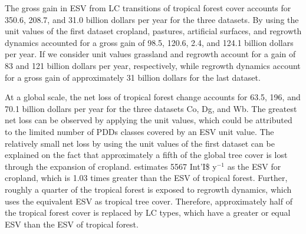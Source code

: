 		The gross gain in \ac{ESV} from \ac{LC} transitions of tropical forest cover accounts for 350.6, 208.7, and 31.0 billion dollars per year for the three datasets. By using the unit values of the first dataset cropland, pastures, artificial surfaces, and regrowth dynamics accounted for a gross gain of 98.5, 120.6, 2.4, and 124.1 billion dollars per year. If we consider \citet{Groot2012} unit values grassland and regrowth account for a gain of 83 and 121 billion dollars per year, respectively, while regrowth dynamics account for a gross gain of approximately 31 billion dollars for the last dataset.

		At a global scale, the net loss of tropical forest change accounts for 63.5, 196, and 70.1 billion dollars per year for the three datasets Co, Dg, and Wb. The greatest net loss can be observed by applying the \citet{Groot2012} unit values, which could be attributed to the limited number of \acp{PDD} classes covered by an \ac{ESV} unit value. The relatively small net loss by using the unit values of the first dataset can be explained on the fact that approximately a fifth of the global tree cover is lost through the expansion of cropland. \citet{Costanza2014} estimates 5567 Int'I\$ y$^{-1}$ as the \ac{ESV} for cropland, which is 1.03 times greater than the \ac{ESV} of tropical forest. Further, roughly a quarter of the tropical forest is exposed to regrowth dynamics, which uses the equivalent \ac{ESV} as tropical tree cover. Therefore, approximately half of the tropical forest cover is replaced by \ac{LC} types, which have a greater or equal \ac{ESV} than the \ac{ESV} of tropical forest.

